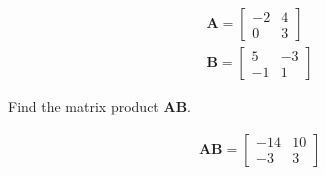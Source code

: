 \begin{align*}
    \boldsymbol{A} = \begin{bmatrix}
    -2 & 4 \\ 0 & 3
    \end{bmatrix} \\
    \boldsymbol{B} = \begin{bmatrix}
    5 & -3 \\ -1 & 1
    \end{bmatrix}
\end{align*}

Find the matrix product $\boldsymbol{AB}$.

\begin{solution}
\begin{align*}
    \boldsymbol{AB} = \begin{bmatrix}
    -14 & 10 \\
    -3 & 3
    \end{bmatrix}
\end{align*}
\end{solution}